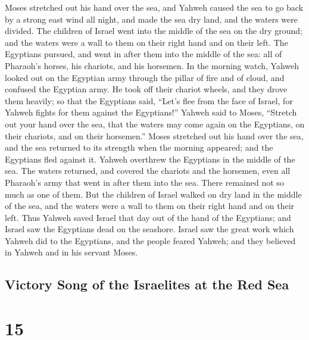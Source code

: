  Moses stretched out his hand over the sea, and Yahweh
caused the sea to go back by a strong east wind all night, and made the
sea dry land, and the waters were divided.  The children
of Israel went into the middle of the sea on the dry ground; and the
waters were a wall to them on their right hand and on their left.
 The Egyptians pursued, and went in after them into the
middle of the sea: all of Pharaoh's horses, his chariots, and his
horsemen.  In the morning watch, Yahweh looked out on the
Egyptian army through the pillar of fire and of cloud, and confused the
Egyptian army.  He took off their chariot wheels, and
they drove them heavily; so that the Egyptians said, ``Let's flee from
the face of Israel, for Yahweh fights for them against the Egyptians!''
 Yahweh said to Moses, ``Stretch out your hand over the
sea, that the waters may come again on the Egyptians, on their chariots,
and on their horsemen.''  Moses stretched out his hand
over the sea, and the sea returned to its strength when the morning
appeared; and the Egyptians fled against it. Yahweh overthrew the
Egyptians in the middle of the sea.  The waters returned,
and covered the chariots and the horsemen, even all Pharaoh's army that
went in after them into the sea. There remained not so much as one of
them.  But the children of Israel walked on dry land in
the middle of the sea, and the waters were a wall to them on their right
hand and on their left.  Thus Yahweh saved Israel that
day out of the hand of the Egyptians; and Israel saw the Egyptians dead
on the seashore.  Israel saw the great work which Yahweh
did to the Egyptians, and the people feared Yahweh; and they believed in
Yahweh and in his servant Moses.

\hypertarget{victory-song-of-the-israelites-at-the-red-sea}{%
\subsection{Victory Song of the Israelites at the Red
Sea}\label{victory-song-of-the-israelites-at-the-red-sea}}

\hypertarget{section-14}{%
\section{15}\label{section-14}}

